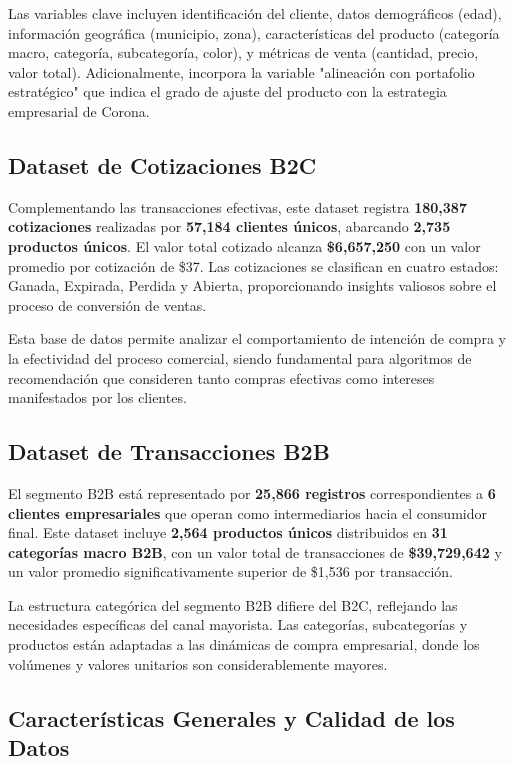 \documentclass[twocolumn]{article}
\begin{document}
Las variables clave incluyen identificación del cliente, datos demográficos (edad), información geográfica (municipio, zona), características del producto (categoría macro, categoría, subcategoría, color), y métricas de venta (cantidad, precio, valor total). Adicionalmente, incorpora la variable "alineación con portafolio estratégico" que indica el grado de ajuste del producto con la estrategia empresarial de Corona.

\subsection{Dataset de Cotizaciones B2C}

Complementando las transacciones efectivas, este dataset registra \textbf{180,387 cotizaciones} realizadas por \textbf{57,184 clientes únicos}, abarcando \textbf{2,735 productos únicos}. El valor total cotizado alcanza \textbf{\$6,657,250} con un valor promedio por cotización de \$37. Las cotizaciones se clasifican en cuatro estados: Ganada, Expirada, Perdida y Abierta, proporcionando insights valiosos sobre el proceso de conversión de ventas.

Esta base de datos permite analizar el comportamiento de intención de compra y la efectividad del proceso comercial, siendo fundamental para algoritmos de recomendación que consideren tanto compras efectivas como intereses manifestados por los clientes.

\subsection{Dataset de Transacciones B2B}

El segmento B2B está representado por \textbf{25,866 registros} correspondientes a \textbf{6 clientes empresariales} que operan como intermediarios hacia el consumidor final. Este dataset incluye \textbf{2,564 productos únicos} distribuidos en \textbf{31 categorías macro B2B}, con un valor total de transacciones de \textbf{\$39,729,642} y un valor promedio significativamente superior de \$1,536 por transacción.

La estructura categórica del segmento B2B difiere del B2C, reflejando las necesidades específicas del canal mayorista. Las categorías, subcategorías y productos están adaptadas a las dinámicas de compra empresarial, donde los volúmenes y valores unitarios son considerablemente mayores.

\subsection{Características Generales y Calidad de los Datos}
\end{document}
